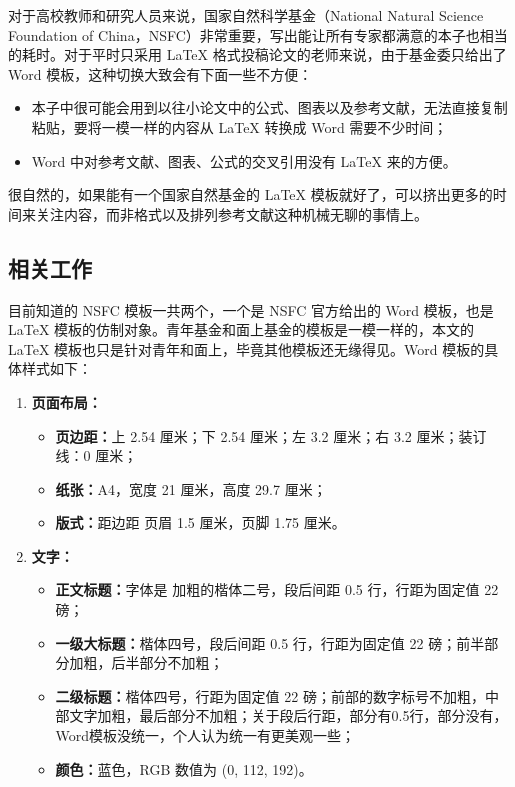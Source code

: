


对于高校教师和研究人员来说，国家自然科学基金（National Natural Science Foundation of China，NSFC）非常重要，写出能让所有专家都满意的本子也相当的耗时。对于平时只采用 LaTeX 格式投稿论文的老师来说，由于基金委只给出了 Word 模板，这种切换大致会有下面一些不方便：
\begin{itemize}
	\item 本子中很可能会用到以往小论文中的公式、图表以及参考文献，无法直接复制粘贴，要将一模一样的内容从 LaTeX 转换成 Word 需要不少时间；
	\item Word 中对参考文献、图表、公式的交叉引用没有 LaTeX 来的方便。
\end{itemize}
很自然的，如果能有一个国家自然基金的 LaTeX 模板就好了，可以挤出更多的时间来关注内容，而非格式以及排列参考文献这种机械无聊的事情上。

\subsection{相关工作}
目前知道的 NSFC 模板一共两个，一个是 NSFC 官方给出的 Word 模板，也是LaTeX 模板的仿制对象。青年基金和面上基金的模板是一模一样的，本文的 LaTeX 模板也只是针对青年和面上，毕竟其他模板还无缘得见。Word 模板的具体样式如下：
\begin{enumerate}[fullwidth,itemindent=0em, label=\arabic*)]
	\item \textbf{页面布局：}
	      \begin{itemize}[itemindent=2em]
	      	\item \textbf{页边距：}上 2.54 厘米；下 2.54 厘米；左 3.2 厘米；右 3.2 厘米；装订线：0 厘米；
	      	\item \textbf{纸张：}A4，宽度 21 厘米，高度 29.7 厘米；
	      	\item \textbf{版式：}距边距 页眉 1.5 厘米，页脚 1.75 厘米。
	      \end{itemize}
	\item \textbf{文字：}
	      \begin{itemize}[itemindent=2em]
	      	\item \textbf{正文标题：}字体是 加粗的楷体二号，段后间距 0.5 行，行距为固定值 22 磅；
	      	\item \textbf{一级大标题：}楷体四号，段后间距 0.5 行，行距为固定值 22 磅；前半部分加粗，后半部分不加粗；
	      	\item \textbf{二级标题：}楷体四号，行距为固定值 22 磅；前部的数字标号不加粗，中部文字加粗，最后部分不加粗；关于段后行距，部分有0.5行，部分没有，Word模板没统一，个人认为统一有更美观一些；
	      	\item \textbf{颜色：}蓝色，RGB 数值为 (0, 112, 192)。
	      \end{itemize}  
\end{enumerate}

